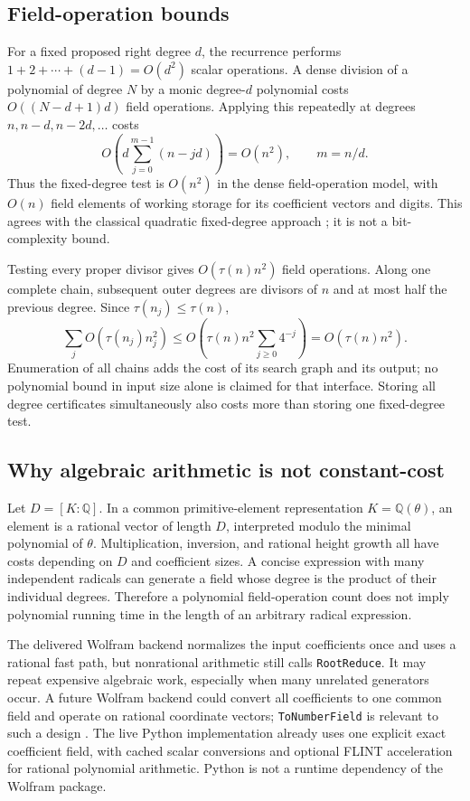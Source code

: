 \documentclass[11pt,a4paper]{article}
\numberwithin{equation}{section}
\theoremstyle{definition}
\theoremstyle{remark}
\newcommand{\Q}{\mathbb{Q}}
\newcommand{\code}[1]{\texttt{#1}}
\begin{document}
\subsection{Field-operation bounds}
For a fixed proposed right degree $d$, the recurrence performs
$1+2+\cdots+(d-1)=O(d^2)$ scalar operations. A dense division of a polynomial
of degree $N$ by a monic degree-$d$ polynomial costs $O((N-d+1)d)$ field
operations. Applying this repeatedly at degrees $n,n-d,n-2d,\ldots$ costs
\[
 O\!\left(d\sum_{j=0}^{m-1}(n-jd)\right)=O(n^2),
 \qquad m=n/d.
\]
Thus the fixed-degree test is $O(n^2)$ in the dense field-operation model,
with $O(n)$ field elements of working storage for its coefficient vectors and
digits. This agrees with the classical quadratic fixed-degree approach
\cite{KL}; it is not a bit-complexity bound.

Testing every proper divisor gives $O(\tau(n)n^2)$ field operations. Along
one complete chain, subsequent outer degrees are divisors of $n$ and at most
half the previous degree. Since $\tau(n_j)\le\tau(n)$,
\[
 \sum_j O(\tau(n_j)n_j^2)
 \le O\!\left(\tau(n)n^2\sum_{j\ge0}4^{-j}\right)
 =O(\tau(n)n^2).
\]
Enumeration of all chains adds the cost of its search graph and its output;
no polynomial bound in input size alone is claimed for that interface.
Storing all degree certificates simultaneously also costs more than storing
one fixed-degree test.

\subsection{Why algebraic arithmetic is not constant-cost}
Let $D=[K:\Q]$. In a common primitive-element representation $K=\Q(\theta)$,
an element is a rational vector of length $D$, interpreted modulo the minimal
polynomial of $\theta$. Multiplication, inversion, and rational height growth
all have costs depending on $D$ and coefficient sizes. A concise expression
with many independent radicals can generate a field whose degree is the
product of their individual degrees. Therefore a polynomial field-operation
count does not imply polynomial running time in the length of an arbitrary
radical expression.

The delivered Wolfram backend normalizes the input coefficients once and
uses a rational fast path, but nonrational arithmetic still calls
\code{RootReduce}. It may repeat expensive algebraic work, especially when
many unrelated generators occur. A future Wolfram backend could convert all
coefficients to one common field and operate on rational coordinate vectors;
\code{ToNumberField} is relevant to such a design \cite{ToNumberField}.
The live Python implementation already uses one explicit exact coefficient
field, with cached scalar conversions and optional FLINT acceleration for
rational polynomial arithmetic. Python is not a runtime dependency of the
Wolfram package.
\end{document}

